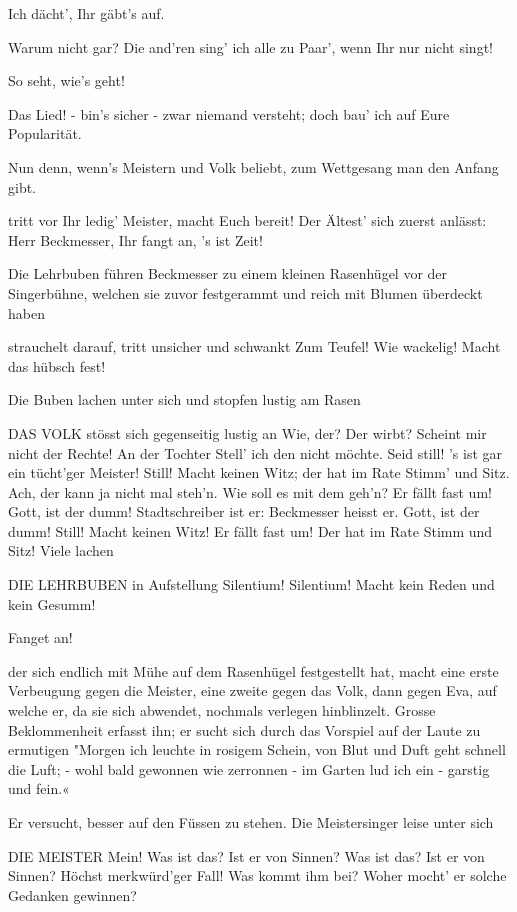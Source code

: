 \begin{drama}
\Sachsspeaks
Ich dächt', Ihr gäbt's auf.

\Beckmesserspeaks
Warum nicht gar?
Die and'ren sing' ich alle zu Paar', wenn Ihr nur nicht singt!

\Sachsspeaks
So seht, wie's geht!

\Beckmesserspeaks
Das Lied! - bin's sicher - zwar niemand versteht;
doch bau' ich auf Eure Popularität.

\Sachsspeaks
Nun denn, wenn's Meistern und Volk beliebt,
zum Wettgesang man den Anfang gibt.

\Kothnerspeaks
tritt vor
Ihr ledig' Meister, macht Euch bereit!
Der Ältest' sich zuerst anlässt:
Herr Beckmesser, Ihr fangt an, 's ist Zeit!

Die Lehrbuben führen Beckmesser zu einem kleinen Rasenhügel vor der Singerbühne, welchen sie zuvor festgerammt und reich mit Blumen überdeckt haben

\Beckmesserspeaks
strauchelt darauf, tritt unsicher und schwankt
Zum Teufel! Wie wackelig! Macht das hübsch fest!

Die Buben lachen unter sich und stopfen lustig am Rasen

DAS VOLK
stösst sich gegenseitig lustig an
Wie, der? Der wirbt? Scheint mir nicht der Rechte!
An der Tochter Stell' ich den nicht möchte.
Seid still! 's ist gar ein tücht'ger Meister!
Still! Macht keinen Witz;
der hat im Rate Stimm' und Sitz.
Ach, der kann ja nicht mal steh'n.
Wie soll es mit dem geh'n?
Er fällt fast um! Gott, ist der dumm!
Stadtschreiber ist er:
Beckmesser heisst er.
Gott, ist der dumm!
Still! Macht keinen Witz!
Er fällt fast um!
Der hat im Rate Stimm und Sitz!
Viele lachen

DIE LEHRBUBEN
in Aufstellung
Silentium! Silentium!
Macht kein Reden und kein Gesumm!

\Kothnerspeaks
Fanget an!

\Beckmesserspeaks
der sich endlich mit Mühe auf dem Rasenhügel festgestellt hat, macht eine erste Verbeugung gegen die Meister, eine zweite gegen das Volk, dann gegen Eva, auf welche er, da sie sich abwendet, nochmals verlegen hinblinzelt. Grosse Beklommenheit erfasst ihn; er sucht sich durch das Vorspiel auf der Laute zu ermutigen
"Morgen ich leuchte in rosigem Schein,
von Blut und Duft geht schnell die Luft; -
wohl bald gewonnen wie zerronnen -
im Garten lud ich ein - garstig und fein.«

Er versucht, besser auf den Füssen zu stehen. Die Meistersinger leise unter sich

DIE MEISTER
Mein! Was ist das?
Ist er von Sinnen?
Was ist das?
Ist er von Sinnen?
Höchst merkwürd'ger Fall! Was kommt ihm bei?
Woher mocht' er solche Gedanken gewinnen?


\end{drama}
